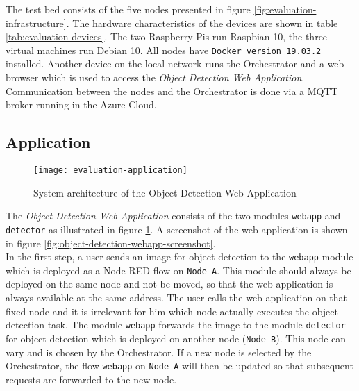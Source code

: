 The test bed consists of the five nodes presented in figure \ref{fig:evaluation-infrastructure}. The hardware characteristics of the devices are shown in table \ref{tab:evaluation-devices}. The two Raspberry Pis run Raspbian 10, the three virtual machines run Debian 10. All nodes have \texttt{Docker version 19.03.2} installed. Another device on the local network runs the Orchestrator and a web browser which is used to access the \textit{Object Detection Web Application}. Communication between the nodes and the Orchestrator is done via a MQTT broker running in the Azure Cloud.

\subsection{Application\label{sec:eval-application}}

\begin{figure}[htb]
    \centering
    \texttt{[image: evaluation-application]}
    \caption{System architecture of the Object Detection Web Application}
    \label{fig:evaluation-object-detection-application}
\end{figure}

The \textit{Object Detection Web Application} consists of the two modules \texttt{webapp} and \texttt{detector} as illustrated in figure \ref{fig:evaluation-object-detection-application}.
A screenshot of the web application is shown in figure \ref{fig:object-detection-webapp-screenshot}.\\

In the first step, a user sends an image for object detection to the \texttt{webapp} module which is deployed as a Node-RED flow on \texttt{Node A}.
This module should always be deployed on the same node and not be moved, so that the web application is always available at the same address.
The user calls the web application on that fixed node and it is irrelevant for him which node actually executes the object detection task.
The module \texttt{webapp} forwards the image to the module \texttt{detector} for object detection which is deployed on another node (\texttt{Node B}).
This node can vary and is chosen by the Orchestrator.
If a new node is selected by the Orchestrator, the flow \texttt{webapp} on \texttt{Node A} will then be updated so that subsequent requests are forwarded to the new node.\\

